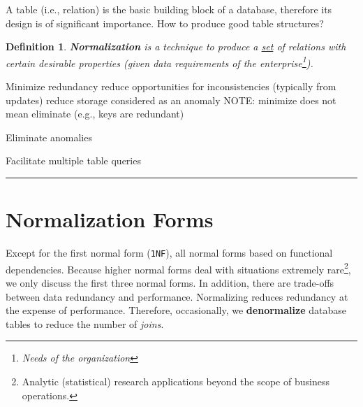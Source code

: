 \documentclass{article}
\newtheorem{definition}{Definition}
\begin{document}
A table (i.e., relation) is the basic building block of a database, therefore its design is of significant importance.  How to produce good table structures?  %

\begin{definition}
    \textbf{Normalization} is a technique to produce a \underline{set} of relations with certain desirable properties (given data requirements of the enterprise\footnote{Needs of the organization}).      
\end{definition}
 
 
\begin{outline}[]
    
    \1 Minimize redundancy 
        \2 reduce opportunities for inconsistencies (typically from updates)
        \2 reduce storage
        \2 considered as an anomaly 
        \2 NOTE: minimize does not mean eliminate (e.g., keys are redundant)

    
    \1 Eliminate anomalies 
    
    \1 Facilitate multiple table queries
       
\end{outline}
 

 
 
\hspace{-0.5cm}\rule[-0.101in]{\textwidth}{0.0025in}
  

 


















\section*{Normalization Forms}
Except for the first normal form (\texttt{1NF}), all normal forms based on functional dependencies.  Because higher normal forms deal with situations extremely rare\footnote{Analytic (statistical) research applications beyond the scope of business operations.}, we only discuss the first three normal forms. In addition, there are trade-offs between data redundancy and
performance.  Normalizing reduces redundancy at the expense of performance.
 Therefore, occasionally, we \textbf{denormalize} database tables to reduce
the number of \textit{joins}.\\
\end{document}

